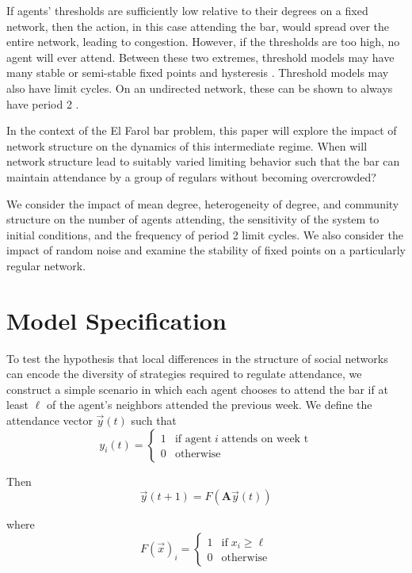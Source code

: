 \documentclass[12pt]{article}
\begin{document}
If agents' thresholds are sufficiently low relative to their degrees on a fixed network, then the action, in this case attending the bar, would spread over the entire network, leading to congestion.  However, if the thresholds are too high, no agent will ever attend.  Between these two extremes, threshold models may have many stable or semi-stable fixed points \cite{adam:2012} and hysteresis \cite{Wiedermann_2020}.  Threshold models may also have limit cycles.  On an undirected network, these can be shown to always have period 2 \cite{grabish:2020} \cite{goles:1980}.

In the context of the El Farol bar problem, this paper will explore the impact of network structure on the dynamics of this intermediate regime.  When will network structure lead to suitably varied limiting behavior such that the bar can maintain attendance by a group of regulars without becoming overcrowded?  

We consider the impact of mean degree, heterogeneity of degree, and community structure on the number of agents attending, the sensitivity of the system to initial conditions, and the frequency of period 2 limit cycles.  We also consider the impact of random noise and examine the stability of fixed points on a particularly regular network.

\section{Model Specification}
To test the hypothesis that local differences in the structure of social networks can encode the diversity of strategies required to regulate attendance, we construct a simple scenario in which each agent chooses to attend the bar if at least $\ell$ of the agent's neighbors attended the previous week.  We define the attendance vector $\vec{y}(t)$ such that
\begin{equation}
  y_i(t) = \begin{cases}
    1 &\text{if agent}\; i \; \text{attends on week t} \\
    0 &\text{otherwise}
  \end{cases}
\end{equation}

Then 
\begin{equation}
  \vec{y}(t + 1) = F(\mathbf{A}\vec{y}(t))
\end{equation}

where
\begin{equation}
  F(\vec{x})_i = \begin{cases}
    1 &\text{if} \; x_i \geq \ell \\
    0 &\text{otherwise}
  \end{cases}
\end{equation}
\end{document}
